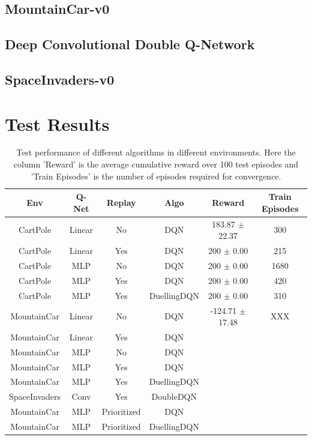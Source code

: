 \documentclass[12pt]{article}
\begin{document}
\pagebreak[4]
\subsection*{MountainCar-v0}

\pagebreak[4]
\subsection{Deep Convolutional Double Q-Network}
\subsection*{SpaceInvaders-v0}

\pagebreak[4]
\section{Test Results}

\begin{table}[h]
\centering
\label{resulttable}
\begin{tabular}{cccccc}
\hline
Env           & Q-Net  & Replay      & Algo        & Reward    & Train Episodes \\ \hline
CartPole      & Linear & No          & DQN         & 183.87 $\pm$ 22.37 & 300      \\
CartPole      & Linear & Yes         & DQN         & 200 $\pm$ 0.00  & 215       \\
CartPole      & MLP    & No          & DQN         & 200 $\pm$ 0.00  & 1680     \\
CartPole      & MLP    & Yes         & DQN         & 200 $\pm$ 0.00  & 420      \\
CartPole      & MLP    & Yes         & DuellingDQN & 200 $\pm$ 0.00  & 310      \\
MountainCar   & Linear & No          & DQN         & -124.71 $\pm$ 17.48  & XXX       \\
MountainCar   & Linear & Yes         & DQN         &           &          \\
MountainCar   & MLP    & No          & DQN         &           &          \\
MountainCar   & MLP    & Yes         & DQN         &           &          \\
MountainCar   & MLP    & Yes         & DuellingDQN &           &          \\
SpaceInvaders & Conv   & Yes         & DoubleDQN   &           &          \\ \hline
MountainCar   & MLP    & Prioritized & DQN         &           &          \\
MountainCar   & MLP    & Prioritized & DuellingDQN &           &          \\ \hline
\end{tabular}
\caption{Test performance of different algorithms in different environments. Here the column 'Reward' is the average cumulative reward over 100 test episodes and 'Train Episodes' is the number of episodes required for convergence.}
\end{table}
\end{document}
